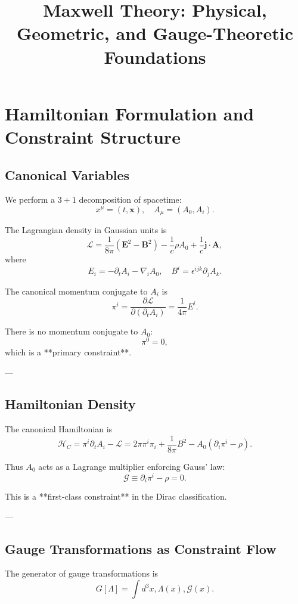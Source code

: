 \documentclass[12pt]{article}
\title{\textbf{Maxwell Theory: Physical, Geometric, and Gauge-Theoretic Foundations}}
\author{ }
\date{}
\begin{document}
\maketitle


\section{Hamiltonian Formulation and Constraint Structure}

\subsection{Canonical Variables}

We perform a $3+1$ decomposition of spacetime:
\[
x^\mu = (t, \mathbf{x}),
\quad
A_\mu = (A_0, A_i).
\]

The Lagrangian density in Gaussian units is
\[
\mathcal{L}
= \frac{1}{8\pi}(\mathbf{E}^2 - \mathbf{B}^2)
- \frac{1}{c}\rho A_0 + \frac{1}{c}\mathbf{j}\cdot \mathbf{A},
  \]
  where
  \[
  E_i = -\partial_t A_i - \nabla_i A_0,
  \quad
  B^i = \epsilon^{ijk}\partial_j A_k.
  \]

The canonical momentum conjugate to $A_i $ is
\[
\pi^i = \frac{\partial \mathcal{L}}{\partial (\partial_t A_i)}
= \frac{1}{4\pi} E^i.
\]

There is no momentum conjugate to $ A_0 $:
\[
\pi^0 = 0,
\]
which is a **primary constraint**.

---

\subsection{Hamiltonian Density}

The canonical Hamiltonian is
\[
\mathcal{H}_C
= \pi^i \partial_t A_i - \mathcal{L}
= 2\pi \pi^i \pi_i + \frac{1}{8\pi} B^2
- A_0 (\partial_i \pi^i - \rho).
  \]

Thus  $A_0$  acts as a Lagrange multiplier enforcing Gauss’ law:
\[
\mathcal{G} \equiv \partial_i \pi^i - \rho = 0.
\]

This is a **first-class constraint** in the Dirac classification.

---

\subsection{Gauge Transformations as Constraint Flow}

The generator of gauge transformations is
\[
G[\Lambda] = \int d^3x, \Lambda(x) , \mathcal{G}(x).
\]
\end{document}
